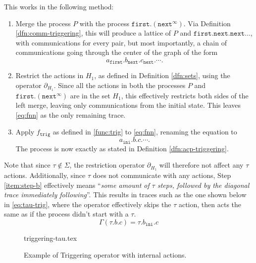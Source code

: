 \documentclass[../hons_project.tex]{subfiles}
\begin{document}
This works in the following method:
\vspace{-5pt}
\begin{enumerate}[label=\alph*)]
	\item Merge the process $P$ with the process $\mathtt{first}.(\mathtt{next}^{\infty})$. Via Definition \ref{dfn:comm-triggering}, this will produce a lattice of $P$ and $\mathtt{first}.\mathtt{next}.\mathtt{next}\dots$, with communications for every pair, but most importantly, a chain of communications going through the center of the graph of the form
	      \begin{equation}\label{eq:fnn}
		      a_{\mathtt{first}}. b_{\mathtt{next}} . c_{\mathtt{next}}. \cdots .
	      \end{equation}
	\item Restrict the actions in $H_{1}$, as defined in Definition \ref{dfn:sets}, using the operator $\partial_{H_{1}}$. Since all the actions in both the processes $P$ and $\mathtt{first}.(\mathtt{next}^{\infty})$ are in the set $H_{1}$, this effectively restricts both sides of the left merge, leaving only communications from the initial state. This leaves \cref{eq:fnn} as the only remaining trace.\label{item:step-b}
	\item Apply $f_{\mathtt{trig}}$ as defined in \cref{func:trig} to \cref{eq:fnn}, renaming the equation to
	      \begin{equation}\label{eq:gamma-result}
		      a_{\mathtt{ini}}. b . c. \cdots .
	      \end{equation}
	      The process is now exactly as stated in Definition \ref{dfn:acp-triggering}.
\end{enumerate}

Note that since $\tau\not\in \Sigma$, the restriction operator $\partial_{H_{1}}$ will therefore not affect any $\tau$ actions. Additionally, since $\tau$ does not communicate with any actions, Step \ref{item:step-b} effectively means ``\textit{some amount of $\tau$ steps, followed by the diagonal trace immediately following}''. This results in traces such as the one shown below in \cref{eq:tau-trig}, where the operator effectively skips the $\tau$ action, then acts the same as if the process didn't start with a $\tau$.
\begin{equation}\label{eq:tau-trig}
	\Gamma(\tau.b.c) = \tau.b_{\mathtt{ini}}.c
\end{equation}

\begin{figure}[!h]
	\centering
	{triggering-tau.tex}
	\caption{Example of Triggering operator with internal actions.}
	\label{fig:triggering-tau}
\end{figure}
\end{document}
